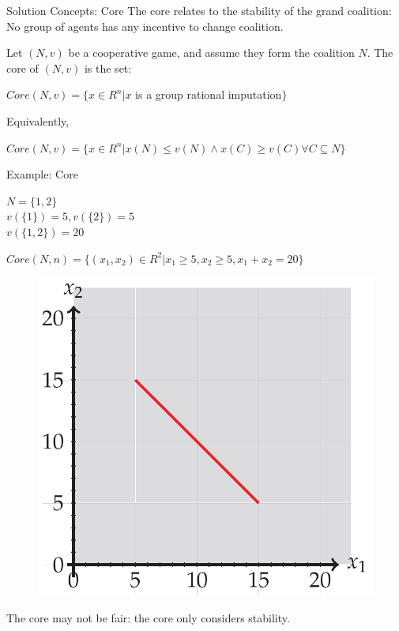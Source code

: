\documentclass{beamer}
\begin{document}
\begin{frame} {Solution Concepts: Core}
    The core relates to the stability of the grand coalition: \\ No group of agents has any incentive to change coalition.
    \begin{definition}\label{dfn:core}
        Let $(N,v)$ be a cooperative game, and assume they form the coalition $N$. The core of $(N,v)$ is the set:
        \vspace{0.1cm}
        \begin{center}
            $Core(N,v) = \{x \in R^n | x$ is a group rational imputation$\}$
        \end{center}
        Equivalently,
        \vspace{0.1cm}
        \begin{center}
            $Core(N,v) = \{x \in R^n | x(N) \leq v(N) \wedge x(C) \geq v(C) \forall C \subseteq N\}$
        \end{center}
    \end{definition}

\end{frame}
\begin{frame} {Example: Core}

    \begin{center}
      $N = \{1,2\}$ \\
      $v(\{1\}) = 5, v(\{2\}) = 5$ \\
      $v(\{1,2\}) = 20$ \\
    \end{center}

    $Core(N,n) = \{(x_1,x_2) \in R^2 | x_1 \geq 5, x_2 \geq 5, x_1 + x_2 = 20\}$

    \begin{figure}[htbp]
        \centering
        \includegraphics[width=0.3 \columnwidth]{figures/coreex1.png}
    \end{figure}

    The core may not be fair: the core only considers stability.

\end{frame}
\end{document}

